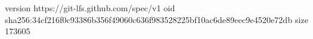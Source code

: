 version https://git-lfs.github.com/spec/v1
oid sha256:34cf216f0c93386b356f49060c636f983528225bf10ac6de89eec9e4520e72db
size 173605
